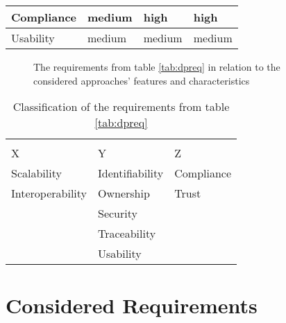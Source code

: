 \begin{table}[H]
\begin{tabular}{|m{3.3cm}||m{3.8cm}||m{3.6cm}|m{3.6cm}|}
\rule{0pt}{4ex} Compliance & \rule{0pt}{4ex}\hspace{38pt}medium & \rule{0pt}{4ex}\hspace{48pt}high & \rule{0pt}{4ex}\hspace{48pt}high\\ [12pt]\hline
\rule{0pt}{4ex} Usability & \rule{0pt}{4ex}\hspace{38pt}medium & \rule{0pt}{4ex}\hspace{38pt}medium & \rule{0pt}{4ex}\hspace{38pt}medium\\ [12pt]\hline
\end{tabular}

    
\end{table}



\begin{figure}[H]
    \centering
    
    \caption{The requirements from table \ref{tab:dpreq} in relation to the considered approaches' features and characteristics}
    \label{fig:cadp}
\end{figure}

\begin{table}[H]
    \centering
    
    \caption{Classification of the requirements from table \ref{tab:dpreq}}
    \label{tab:classdpreq}
    
\begin{tabular}{m{2.7cm} m{2.5cm} m{2cm}}
&&\\
\hspace{30pt}X & \hspace{30pt}Y & \hspace{25pt}Z \\ \hline
\rule{0pt}{3ex}Scalability & \rule{0pt}{3ex}Identifiability & \rule{0pt}{3ex}Compliance \\ 
Interoperability & Ownership & Trust \\ 
                & Security & \\
                & Traceability & \\
                & Usability & \\
\end{tabular}

\end{table}
\newpage

\section{Considered Requirements}
\label{sec:consideredrequirements}

